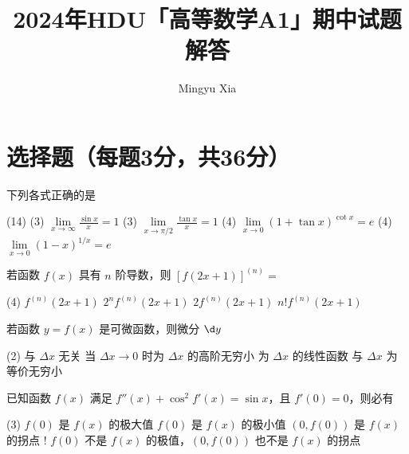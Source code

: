 \documentclass[quiet]{ctexart}
\title{\sffamily\bfseries 2024年HDU「高等数学A1」期中试题解答}
\author{Mingyu Xia}
\begin{document}
\maketitle

\section{选择题（每题3分，共36分）}

\begin{problem}
  下列各式正确的是
  \begin{tasks}(14)
    \task*(3) $\lim\limits_{x \to \infty} \frac{\sin x}{x} = 1$
    \task*(3) $\lim\limits_{x \to \pi/2} \frac{\tan x}{x} = 1$
    \task*(4) $\lim\limits_{x \to 0} (1 + \tan x)^{\cot x} = e$
    \task*(4) $\lim\limits_{x \to 0} (1 - x)^{1/x} = e$
  \end{tasks}
\end{problem}
\begin{solution}

\end{solution}

\begin{problem}
  若函数 $f(x)$ 具有 $n$ 阶导数，则 $[f(2x + 1)]^{(n)} = $
  \begin{tasks}(4)
    \task $f^{(n)}(2x + 1)$
    \task $2^n f^{(n)}(2x + 1)$
    \task $2f^{(n)}(2x + 1)$
    \task $n! f^{(n)}(2x + 1)$
  \end{tasks}
\end{problem}
\begin{solution}

\end{solution}

\begin{problem}
  若函数 $y = f(x)$ 是可微函数，则微分 $\d y$
  \begin{tasks}(2)
    \task 与 $\Delta x$ 无关
    \task 当 $\Delta x \to 0$ 时为 $\Delta x$ 的高阶无穷小
    \task 为 $\Delta x$ 的线性函数
    \task 与 $\Delta x$ 为等价无穷小
  \end{tasks}
\end{problem}
\begin{solution}

\end{solution}

\begin{problem}
  已知函数 $f(x)$ 满足 $f''(x) + \cos^2 f'(x) = \sin x$，且 $f'(0) = 0$，则必有
  \begin{tasks}(3)
    \task $f(0)$ 是 $f(x)$ 的极大值
    \task $f(0)$ 是 $f(x)$ 的极小值
    \task $(0,f(0))$ 是 $f(x)$ 的拐点
    \task! $f(0)$ 不是 $f(x)$ 的极值，$(0,f(0))$ 也不是 $f(x)$ 的拐点
  \end{tasks}
\end{problem}
\begin{solution}

\end{solution}
\end{document}
